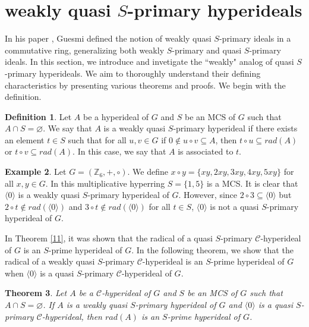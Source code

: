 \documentclass[preprint,review,10pt]{amsart}
\newtheorem{theorem}{Theorem}[section]
\theoremstyle{definition}
\newtheorem{definition}[theorem]{Definition}
\newtheorem{example}[theorem]{Example}
\theoremstyle{remark}
\numberwithin{equation}{section}
\begin{document}
\section{weakly quasi $S$-primary hyperideals}
In his paper \cite{Guesmi}, Guesmi defined the notion of weakly quasi $S$-primary ideals in a commutative ring, generalizing both weakly $S$-primary and quasi $S$-primary ideals.  In this section, we introduce and invetigate the ``weakly" analog of quasi $S$-primary hyperideals. We aim to thoroughly understand their defining characteristics by presenting various theorems and proofs. We begin with the deﬁnition.
\begin{definition}
Let $A$ be a  hyperideal of $G$ and $S$ be an MCS of $G$ such that $A \cap S=\varnothing$. We say that $A$ is a weakly quasi $S$-primary hyperideal if there exists an element  $t \in S$ such that for all $u,v \in G$ if $0 \notin u \circ v \subseteq A$, then $t \circ u \subseteq rad(A)$ or $t \circ v \subseteq rad(A)$. In this case, we say that $A$ is associated to $t$.
\end{definition}
\begin{example} \label{weak}
Let  $G=(\mathbb{Z}_6, +, \circ )$. We define $x \circ y =\{xy,2xy,3xy,4xy,5xy\}$ for all $x,y \in G$. In this multiplicative hyperring $S=\{1,5\}$ is a MCS. It is clear that $\langle 0 \rangle$ is a weakly quasi $S$-primary hyperideal of $G$. However, since $2 \circ 3 \subseteq  \langle 0 \rangle$ but $2 \circ t \notin rad(\langle 0 \rangle)$ and $3 \circ t \notin rad( \langle 0 \rangle)$ for all $t \in S$,  $\langle 0 \rangle$ is not a quasi $S$-primary hyperideal of $G$.
\end{example}
In Theorem \ref{11}, it was shown that the radical of a quasi $S$-primary $\mathcal{C}$-hyperideal of $G$ is an $S$-prime hyperideal of $G$. In the following theorem, we show that  the radical of a weakly quasi $S$-primary $\mathcal{C}$-hyperideal is an $S$-prime hyperideal of $G$ when $\langle 0 \rangle$ is a quasi $S$-primary $\mathcal{C}$-hyperideal of $G$.
\begin{theorem} \label{21}
Let $A$ be a  $\mathcal{C}$-hyperideal of $G$ and $S$ be an MCS of $G$ such that $A \cap S=\varnothing$. If $A$ is a weakly quasi $S$-primary hyperideal of $G$ and $\langle 0 \rangle$ is a quasi $S$-primary $\mathcal{C}$-hyperideal, then $rad(A)$ is an $S$-prime hyperideal of $G$. 
\end{theorem}
\end{document}
